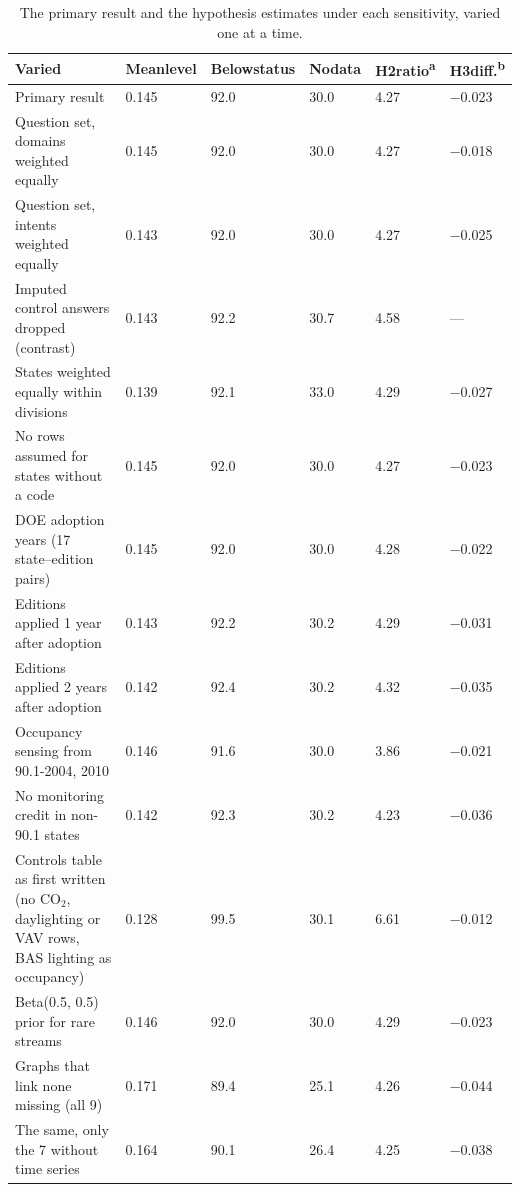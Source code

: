 \begin{table}[!htbp]
\centering
\footnotesize\linespread{1}\selectfont
\caption{The primary result and the hypothesis estimates under each sensitivity, varied one at a time.}
\label{tab:table_sensitivities}
\setlength{\tabcolsep}{4pt}
\begin{tabular}{L{6.7cm}L{1.02cm}L{1.02cm}L{1.02cm}L{1.02cm}L{1.15cm}}
\toprule
Varied & Mean\newline level & Below\newline status & No\newline data & H2\newline ratio\textsuperscript{a} & H3\newline diff.\textsuperscript{b} \\
\midrule
Primary result & 0.145 & 92.0 & 30.0 & 4.27 & $-$0.023 \\
Question set, domains weighted equally & 0.145 & 92.0 & 30.0 & 4.27 & $-$0.018 \\
Question set, intents weighted equally & 0.143 & 92.0 & 30.0 & 4.27 & $-$0.025 \\
Imputed control answers dropped (contrast) & 0.143 & 92.2 & 30.7 & 4.58 & — \\
States weighted equally within divisions & 0.139 & 92.1 & 33.0 & 4.29 & $-$0.027 \\
No rows assumed for states without a code & 0.145 & 92.0 & 30.0 & 4.27 & $-$0.023 \\
DOE adoption years (17 state--edition pairs) & 0.145 & 92.0 & 30.0 & 4.28 & $-$0.022 \\
Editions applied 1 year after adoption & 0.143 & 92.2 & 30.2 & 4.29 & $-$0.031 \\
Editions applied 2 years after adoption & 0.142 & 92.4 & 30.2 & 4.32 & $-$0.035 \\
Occupancy sensing from 90.1-2004, 2010 & 0.146 & 91.6 & 30.0 & 3.86 & $-$0.021 \\
No monitoring credit in non-90.1 states & 0.142 & 92.3 & 30.2 & 4.23 & $-$0.036 \\
Controls table as first written (no CO$_2$, daylighting or VAV rows, BAS lighting as occupancy) & 0.128 & 99.5 & 30.1 & 6.61 & $-$0.012 \\
Beta(0.5, 0.5) prior for rare streams & 0.146 & 92.0 & 30.0 & 4.29 & $-$0.023 \\
Graphs that link none missing (all 9) & 0.171 & 89.4 & 25.1 & 4.26 & $-$0.044 \\
The same, only the 7 without time series & 0.164 & 90.1 & 26.4 & 4.25 & $-$0.038 \\

\end{tabular}
\end{table}
